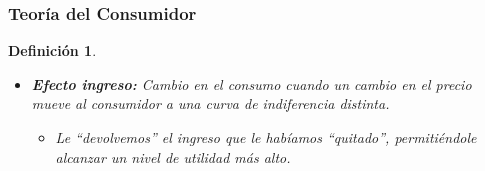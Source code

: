 \documentclass{beamer}
\newtheorem{mydef}{Definición}
\begin{document}
		\begin{frame}
			\frametitle{Teoría del Consumidor}
			\begin{mydef}
				\begin{itemize}
						\item \textbf{Efecto ingreso: } Cambio en el consumo cuando un cambio en el precio mueve al consumidor a una curva de indiferencia distinta.
							\begin{itemize}
								\item Le ``devolvemos'' el ingreso que le habíamos ``quitado'', permitiéndole alcanzar un nivel de utilidad más alto.  
							\end{itemize}
				\end{itemize}
			\end{mydef}
		\end{frame}	
\end{document}

